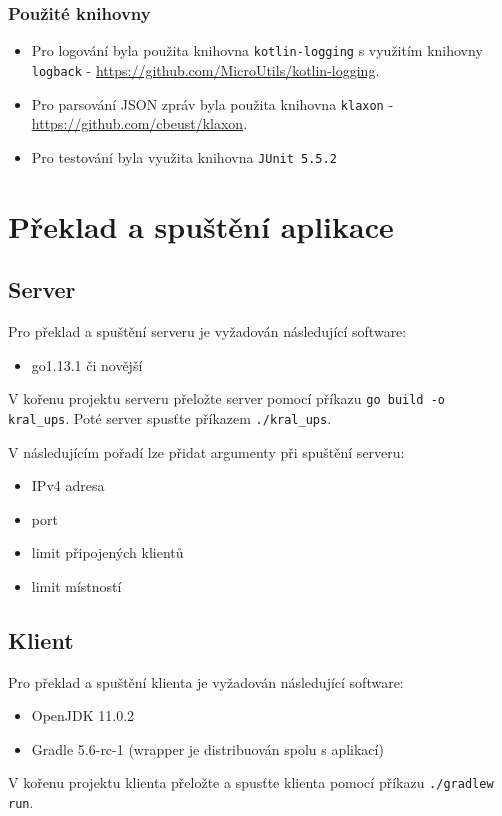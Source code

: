 \documentclass[12pt, a4paper]{article}
\let\oldsection\section
\renewcommand\section{\clearpage\oldsection}
\begin{document}
			\subsubsection{Použité knihovny}
			\begin{itemize}
				\item Pro logování byla použita knihovna \texttt{kotlin-logging} s využitím knihovny \texttt{logback} - \href{https://github.com/MicroUtils/kotlin-logging}{https://github.com/MicroUtils/kotlin-logging}. 

	\item Pro parsování JSON zpráv byla použita knihovna \texttt{klaxon} -\\ \href{https://github.com/cbeust/klaxon}{https://github.com/cbeust/klaxon}. 
		\item Pro testování byla využita knihovna \texttt{JUnit 5.5.2}
			\end{itemize}
			
	\section{Překlad a spuštění aplikace}
	\subsection{Server}
	Pro překlad a spuštění serveru je vyžadován následující software:
	\begin{itemize}
		\item go1.13.1 či novější
	\end{itemize}
	V kořenu projektu serveru přeložte server pomocí příkazu \texttt{go build -o kral\_ups}. Poté server spusťte příkazem \texttt{./kral\_ups}.
	
	\noindent V následujícím pořadí lze přidat argumenty při spuštění serveru:
	\begin{itemize}
		\item IPv4 adresa
		\item port
		\item limit připojených klientů
		\item limit místností
	\end{itemize}
	\subsection{Klient}
	Pro překlad a spuštění klienta je vyžadován následující software:
	\begin{itemize}
		\item OpenJDK 11.0.2
		\item Gradle 5.6-rc-1 (wrapper je distribuován spolu s aplikací)
	\end{itemize}
	V kořenu projektu klienta přeložte a spusťte klienta pomocí příkazu \texttt{./gradlew run}.
\end{document}
